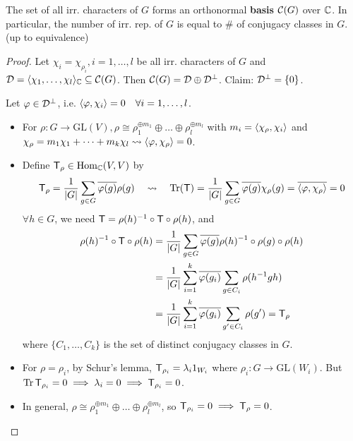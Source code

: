 \begin{theorem}
  The set of all irr. characters of $G$ forms an orthonormal {\bf basis}
  $\mathcal{C}(G)$ over $\mathbb{C}$. In particular, the number of irr. rep. of $G$ is equal
  to \# of conjugacy classes in $G$. (up to equivalence)

  \begin{proof}
    Let $\chi_i = \chi_{\rho_i}, i = 1, \dots, l$ be all irr.
    characters of $G$ and $\mathcal{D} = \langle\chi_1, \dots, \chi_l\rangle_{\mathbb{C}}
    \subseteq \mathcal{C}(G)$. Then $\mathcal{C}(G) = \mathcal{D} \oplus \mathcal{D}^\perp$.
    Claim: $\mathcal{D}^\perp = \{0\}$.

    Let $\varphi \in \mathcal{D}^\perp$, i.e. $\langle\varphi, \chi_i\rangle = 0 \quad
    \forall i = 1,\dots, l$.
    \begin{itemize}
      \item For $\rho: G\to \text{GL}(V),
        \rho \cong \rho_1^{\oplus m_1} \oplus\dots\oplus\rho_l^{\oplus m_l}$
        with $m_i = \langle\chi_\rho, \chi_i\rangle$ and
        $\chi_\rho = m_1\chi_1 + \dots + m_k\chi_l \leadsto
        \langle\varphi, \chi_\rho\rangle = 0$.
      \item Define ${\sf T}_\rho \in \operatorname{Hom}_{\mathbb{C}}(V, V)$ by
        \[
          {\sf T}_\rho = \frac{1}{\lvert G\rvert} \sum_{g\in G}
          \overline{\varphi(g)} \rho(g)
          \quad \leadsto \quad
          \operatorname{Tr}({\sf T}) = \frac{1}{\lvert G\rvert} \sum_{g\in G}
          \overline{\varphi(g)} \chi_\rho(g)
          = \overline{\langle\varphi, \chi_\rho\rangle} = 0
        \]
        $\forall h \in G$, we need 
        ${\sf T} = \rho(h)^{-1}\circ{\sf T}\circ\rho(h)$, and
        \begin{align*}
          \rho(h)^{-1}\circ{\sf T}\circ\rho(h)
          &= \frac{1}{\lvert G\rvert} \sum_{g\in G}
          \overline{\varphi(g)} \rho(h)^{-1}\circ\rho(g)\circ\rho(h) \\
          &= \frac{1}{\lvert G\rvert} \sum_{i=1}^k
          \overline{\varphi(g_i)} \sum_{g\in C_i} \rho(h^{-1}gh) \\
          &= \frac{1}{\lvert G\rvert} \sum_{i=1}^k
          \overline{\varphi(g_i)} \sum_{g'\in C_i} \rho(g') = {\sf T}_\rho
        \end{align*}
        where $\{C_1, \dots, C_k\}$ is the set of distinct conjugacy
        classes in $G$.
      \item For $\rho = \rho_i$, by Schur's lemma,
        ${\sf T}_{\rho_i} = \lambda_i 1_{W_i}$ where
        $\rho_i: G\to \text{GL}(W_i)$.
        But $\operatorname{Tr}{{\sf T}_{\rho_i}} = 0 \implies \lambda_i = 0
        \implies {\sf T}_{\rho_i} = 0$.
      \item In general,
        $\rho \cong \rho_1^{\oplus m_1} \oplus\dots\oplus\rho_l^{\oplus m_l}$,
        so ${\sf T}_{\rho_i} = 0 \implies {\sf T}_\rho = 0$.


\end{itemize}
\end{proof}
\end{theorem}
